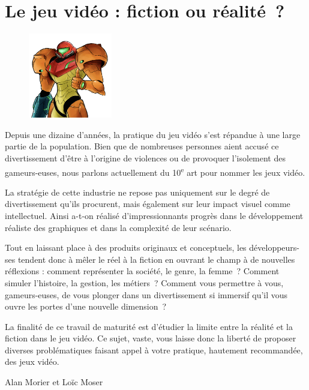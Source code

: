 \documentclass[
  10pt,
  french,
  a5paper,
  openany]{book}
\newenvironment{signature}{\begin{flushright}}{\end{flushright}}
\begin{document}
\hypertarget{le-jeu-viduxe9o-fiction-ou-ruxe9alituxe9}{%
\chapter{Le jeu vidéo : fiction ou réalité~?}\label{le-jeu-viduxe9o-fiction-ou-ruxe9alituxe9}}

\begin{figure}

{\centering \includegraphics[height=10em]{images/le-jeu-video-fiction-ou-realite} 

}

\end{figure}

Depuis une dizaine d'années, la pratique du jeu vidéo s'est répandue à une large partie de la population. Bien que de nombreuses personnes aient accusé ce divertissement d'être à l'origine de violences ou de provoquer l'isolement des gameurs-euses, nous parlons actuellement du 10\textsuperscript{e} art pour nommer les jeux vidéo.

La stratégie de cette industrie ne repose pas uniquement sur le degré de divertissement qu'ils procurent, mais également sur leur impact visuel comme intellectuel. Ainsi a-t-on réalisé d'impressionnants progrès dans le développement réaliste des graphiques et dans la complexité de leur scénario.

Tout en laissant place à des produits originaux et conceptuels, les développeurs-ses tendent donc à mêler le réel à la fiction en ouvrant le champ à de nouvelles réflexions : comment représenter la société, le genre, la femme~? Comment simuler l'histoire, la gestion, les métiers~? Comment vous permettre à vous, gameurs-euses, de vous plonger dans un divertissement si immersif qu'il vous ouvre les portes d'une nouvelle dimension~?

La finalité de ce travail de maturité est d'étudier la limite entre la réalité et la fiction dans le jeu vidéo. Ce sujet, vaste, vous laisse donc la liberté de proposer diverses problématiques faisant appel à votre pratique, hautement recommandée, des jeux vidéo.

\begin{signature}
Alan Morier et Loïc Moser

\end{signature}
\end{document}
